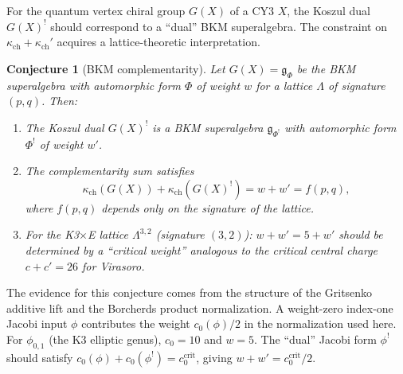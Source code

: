 \documentclass[11pt]{article}
\newtheorem{conjecture}[theorem]{Conjecture}
\theoremstyle{definition}
\theoremstyle{remark}
\begin{document}
For the quantum vertex chiral group $G(X)$ of a CY3 $X$, the Koszul
dual $G(X)^!$ should correspond to a ``dual'' BKM superalgebra. The
constraint on $\kappa_{\mathrm{ch}} + \kappa_{\mathrm{ch}}'$ acquires a lattice-theoretic
interpretation.

\begin{conjecture}[BKM complementarity]
\label{conj:bkm-complementarity}
Let $G(X) = \mathfrak{g}_{\Phi}$ be the BKM superalgebra with automorphic
form $\Phi$ of weight $w$ for a lattice $\Lambda$ of signature $(p,q)$.
Then:
\begin{enumerate}[label=\textup{(\roman*)}]
\item The Koszul dual $G(X)^!$ is a BKM superalgebra
 $\mathfrak{g}_{\Phi^!}$ with automorphic form $\Phi^!$ of weight $w'$.
\item The complementarity sum satisfies
 \begin{equation}\label{eq:bkm-complementarity}
 \kappa_{\mathrm{ch}}(G(X)) + \kappa_{\mathrm{ch}}(G(X)^!)
 = w + w'
 = f(p, q),
 \end{equation}
 where $f(p,q)$ depends only on the signature of the lattice.
\item For the K3$\times$E lattice $\Lambda^{3,2}$ (signature $(3,2)$):
 $w + w' = 5 + w'$ should be determined by a ``critical weight''
 analogous to the critical central charge $c + c' = 26$ for Virasoro.
\end{enumerate}
\end{conjecture}

The evidence for this conjecture comes from the structure of the Gritsenko
additive lift and the Borcherds product normalization. A weight-zero
index-one Jacobi input $\phi$ contributes the weight
$c_0(\phi)/2$ in the normalization used here. For $\phi_{0,1}$ (the K3
elliptic genus), $c_0 = 10$ and $w = 5$. The ``dual'' Jacobi form
$\phi^!$ should
satisfy $c_0(\phi) + c_0(\phi^!) = c_0^{\mathrm{crit}}$, giving
$w + w' = c_0^{\mathrm{crit}}/2$.
\end{document}
